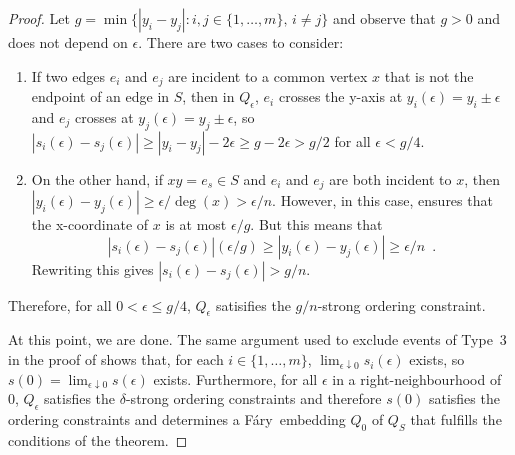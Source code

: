 \documentclass{patmorin}
\newcommand{\Fary}{Fáry}
\begin{document}
\begin{proof}
  Let $g=\min\{|y_i-y_j|: i,j\in\{1,\ldots,m\},\, i\neq j\}$ and observe
  that $g>0$ and does not depend on $\epsilon$.  There are two cases
  to consider:

  \begin{enumerate}
     \item If two edges $e_i$ and $e_j$ are incident to a common
     vertex $x$ that is not the endpoint of an edge in $S$, then
     in $Q_\epsilon$, $e_i$ crosses the y-axis at $y_i(\epsilon) =
     y_i\pm\epsilon$ and $e_j$ crosses at $y_j(\epsilon)=y_j\pm\epsilon$,
     so $|s_i(\epsilon)-s_j(\epsilon)| \ge |y_i-y_j|-2\epsilon \ge
     g-2\epsilon > g/2$ for all $\epsilon < g/4$.

    \item On the other hand, if $xy=e_s\in S$ and $e_i$ and $e_j$
    are both incident to $x$, then $|y_i(\epsilon)-y_j(\epsilon)|
    \ge \epsilon/\deg(x) > \epsilon/n$.  However, in this case,
     ensures that the x-coordinate of $x$ is at
    most $\epsilon/g$.  But this means that
    \[
       |s_i(\epsilon)-s_j(\epsilon)|(\epsilon/g) 
            \ge |y_i(\epsilon)-y_j(\epsilon)| 
            \ge \epsilon/n \enspace .
    \]
    Rewriting this gives $|s_i(\epsilon)-s_j(\epsilon)| > g/n$.  
  \end{enumerate}
  Therefore, for all $0<\epsilon\le g/4$, $Q_\epsilon$ satisifies the
  $g/n$-strong ordering constraint.

  At this point, we are done. The same argument used to exclude events
  of Type~3 in the proof of  shows that, for each
  $i\in\{1,\ldots,m\}$, $\lim_{\epsilon\downarrow 0} s_i(\epsilon)$
  exists, so $s(0)=\lim_{\epsilon\downarrow 0} s(\epsilon)$ exists.
  Furthermore, for all $\epsilon$ in a right-neighbourhood of $0$,
  $Q_\epsilon$ satisfies the $\delta$-strong ordering constraints and
  therefore $s(0)$ satisfies the ordering constraints and determines
  a \Fary\ embedding $Q_0$ of $Q_S$ that fulfills the conditions of
  the theorem.
\end{proof}


%
%
%
%
\end{document}
